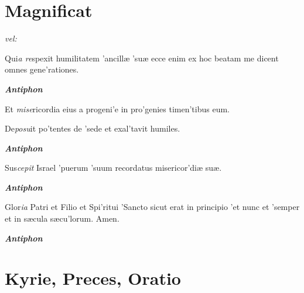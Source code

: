 \documentclass[initial=ZallmanCaps,staff=19,font=greciliae,11pt,a4paper,openany,twoside,choralsign=PfefferMediaeval]{gregorian}
\begin{document}
\section*{Magnificat}
\par
\textit{vel:}\par
{}
\par\vskip9bp
\begin{multicols}{2}\setlength{\columnseprule}{0.2px}
Qui\textit{a re}spexit humilitatem 'ancillæ 'suæ \grestar{} ecce enim ex hoc beatam me dicent omnes gene'rationes.\par
{}\par
\textit{\textbf{Antiphon}}\par
Et \textit{mise}ricordia eius a progeni'e in pro'genies \grestar{} timen'tibus eum.\par
{}\par
De\textit{posu}it po'tentes de 'sede \grestar{} et exal'tavit humiles.\par
\textit{\textbf{Antiphon}}\par
{}\par
Sus\textit{cepit} Israel 'puerum 'suum \grestar{} recordatus misericor'diæ suæ.\par
{}\par
\textit{\textbf{Antiphon}}\par
Glor\textit{ia} Patri et Filio et Spi'ritui 'Sancto \grestar{} sicut erat in principio 'et nunc et 'semper \grestar{} et in sæcula sæcu'lorum. Amen.\par
\textit{\textbf{Antiphon}}\par
\end{multicols}
\vskip3bp
\section*{Kyrie, Preces, Oratio}
\par
{}\par
{}\par
{}\par
\end{document}
